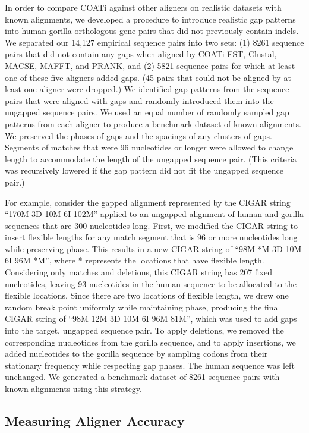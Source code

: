\documentclass[12pt,letterpaper]{article}
\begin{document}
In order to compare COATi against other aligners on realistic datasets with known alignments, we developed a procedure to introduce realistic gap patterns into human-gorilla orthologous gene pairs that did not previously contain indels. We separated our 14,127 empirical sequence pairs into two sets: %
(1) 8261 sequence pairs that did not contain any gaps when aligned by COATi FST, Clustal\textOmega{}, MACSE, MAFFT, and PRANK, and (2) 5821 sequence pairs for which at least one of these five aligners added gaps.
(45 pairs that could not be aligned by at least one aligner were dropped.) We identified gap patterns from the sequence pairs that were aligned with gaps and randomly introduced them into the ungapped sequence pairs. We used an equal number of randomly sampled gap patterns from each aligner to produce a benchmark dataset of known alignments. We preserved the phases of gaps and the spacings of any clusters of gaps. Segments of matches that were 96 nucleotides or longer were allowed to change length to accommodate the length of the ungapped sequence pair. (This criteria was recursively lowered if the gap pattern did not fit the ungapped sequence pair.)

For example, consider the gapped alignment represented by the CIGAR string
%
``170M 3D 10M 6I 102M'' %
%
applied to an ungapped alignment of human and gorilla sequences that are 300 nucleotides long. First, we modified the CIGAR string to insert flexible lengths for any match segment that is 96 or more nucleotides long while preserving phase. This results in a new CIGAR string of
%
``98M *M 3D 10M 6I 96M *M'',
%
where * represents the locations that have flexible length. Considering only matches and deletions, this CIGAR string has 207 fixed nucleotides, leaving 93 nucleotides in the human sequence to be allocated to the flexible locations. Since there are two locations of flexible length, we drew one random break point uniformly while maintaining phase, producing the final CIGAR string of
%
``98M 12M 3D 10M 6I 96M 81M'',
%
which was used to add gaps into the target, ungapped sequence pair.
To apply deletions, we removed the corresponding nucleotides from the gorilla sequence, and to apply insertions, we added nucleotides to the gorilla sequence by sampling codons from their stationary frequency while respecting gap phases. The human sequence was left unchanged.
%
We generated a benchmark dataset of 8261 sequence pairs with known alignments using this strategy.

\subsection*{Measuring Aligner Accuracy}
\end{document}

